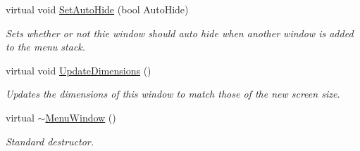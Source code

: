 \begin{DoxyCompactItemize}
virtual void \hyperlink{classMezzanine_1_1UI_1_1MenuWindow_aea2caf3b37d645fca123611060ccfa4f}{SetAutoHide} (bool AutoHide)
\begin{DoxyCompactList}\small\item\em Sets whether or not thie window should auto hide when another window is added to the menu stack. \item\end{DoxyCompactList}\item 
virtual void \hyperlink{classMezzanine_1_1UI_1_1MenuWindow_a9100422fa989e3c3d41e9b22046773f7}{UpdateDimensions} ()
\begin{DoxyCompactList}\small\item\em Updates the dimensions of this window to match those of the new screen size. \item\end{DoxyCompactList}\item 
\hypertarget{classMezzanine_1_1UI_1_1MenuWindow_a09f5f7ec50a29bce7b3b1b5e0f2c07db}{
virtual \hyperlink{classMezzanine_1_1UI_1_1MenuWindow_a09f5f7ec50a29bce7b3b1b5e0f2c07db}{$\sim$MenuWindow} ()}
\label{classMezzanine_1_1UI_1_1MenuWindow_a09f5f7ec50a29bce7b3b1b5e0f2c07db}

\begin{DoxyCompactList}\small\item\em Standard destructor. \item\end{DoxyCompactList}\end{DoxyCompactItemize}
